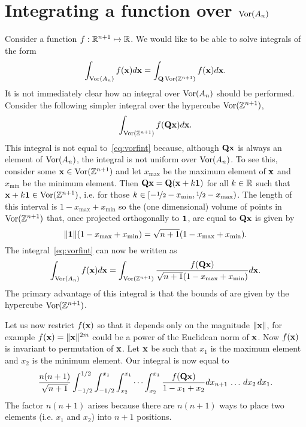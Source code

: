 \documentclass[draftcls, onecolumn, 11pt]{IEEEtran}
\begin{document}
\section{Integrating a function over $\operatorname{Vor}(A_n)$}\label{sec:integr-funct-over}

Consider a function $f : {\mathbb R}^{n+1} \mapsto {\mathbb R}$.  We would like to be able to solve integrals of the form
\begin{equation}\label{eq:vorfint}
\int_{\vor(A_n)} f(\xbf) d\xbf = \int_{\Qbf\vor(\ints^{n+1})} f(\xbf) d\xbf.
\end{equation}
It is not immediately clear how an integral over $\operatorname{Vor}(A_n)$ should be performed.  Consider the following simpler integral over the hypercube $\operatorname{Vor}({\mathbb Z}^{n+1})$,
\[
\int_{\operatorname{Vor}({\mathbb Z}^{n+1})} f(\mathbf{Q}\mathbf{x}) d\mathbf{x}.
\]
This integral is not equal to~\eqref{eq:vorfint} because, although $\mathbf{Q}\mathbf{x}$ is always an element of $\operatorname{Vor}(A_n)$, the integral is not uniform over $\operatorname{Vor}(A_n)$.  To see this, consider some $\mathbf{x} \in \operatorname{Vor}({\mathbb Z}^{n+1})$ and let $x_{\text{max}}$ be the maximum element of $\mathbf{x}$ and $x_{\text{min}}$ be the minimum element.  Then $\mathbf{Q}\mathbf{x} = \mathbf{Q}(\mathbf{x} + k \boldsymbol{1})$ for all $k \in {\mathbb R}$ such that $\mathbf{x} +  k \boldsymbol{1} \in \operatorname{Vor}({\mathbb Z}^{n+1})$, i.e. for those $k \in [-\nicefrac{1}{2} - x_{\text{min}}, \nicefrac{1}{2} - x_{\text{max}})$.  The length of this interval is $1 - x_{\text{max}} + x_{\text{min}}$ so the (one dimensional) volume of points in $\operatorname{Vor}({\mathbb Z}^{n+1})$ that, once projected orthogonally to $\boldsymbol{1}$, are equal to $\mathbf{Q}\mathbf{x}$ is given by 
\[
\|\boldsymbol{1}\|(1 - x_{\text{max}} + x_{\text{min}}) = \sqrt{n+1}(1 - x_{\text{max}} + x_{\text{min}}).
\] 
The integral~\eqref{eq:vorfint} can now be written as
\[
\int_{\operatorname{Vor}(A_n)} f(\mathbf{x}) d\mathbf{x} =  \int_{\operatorname{Vor}({\mathbb Z}^{n+1})} \frac{f(\mathbf{Q}\mathbf{x})}{\sqrt{n+1}(1 - x_{\text{max}} + x_{\text{min}})}  d\mathbf{x}.
\]
The primary advantage of this integral is that the bounds of are given by the hypercube $\operatorname{Vor}({\mathbb Z}^{n+1})$.

Let us now restrict $f(\mathbf{x})$ so that it depends only on the magnitude $\|\mathbf{x}\|$, for example $f(\mathbf{x}) = \|\mathbf{x}\|^{2m}$ could be a power of the Euclidean norm of $\mathbf{x}$.  Now $f(\mathbf{x})$ is invariant to permutation of $\mathbf{x}$.  Let $\mathbf{x}$ be such that $x_1$ is the maximum element and $x_2$ is the minimum element.  Our integral is now equal to
\[
\frac{n (n+1)}{\sqrt{n+1}} \int^{1/2}_{-1/2} \int^{x_1}_{-1/2}  \int^{x_1}_{x_2} \cdots \int^{x_1}_{x_2} \frac{f(\mathbf{Q}\mathbf{x})}{1 - x_{1} + x_{2}}  dx_{n+1} \, \dots \, dx_2 \, dx_1.
\]
The factor $n(n+1)$ arises because there are $n(n+1)$ ways to place two elements (i.e. $x_1$ and $x_2$) into $n+1$ positions.  
\end{document}
